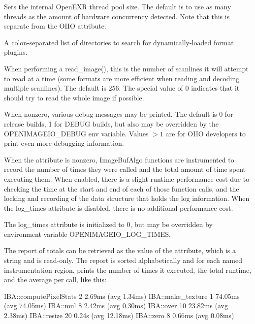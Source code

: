 \vspace{10pt}
Sets the internal OpenEXR thread pool size. The default is to use as many
threads as the amount of hardware concurrency detected.
Note that this is separate from the OIIO
 attribute.
\apiend

\vspace{10pt}
A colon-separated list of directories to search for 
dynamically-loaded format plugins.
\apiend

\vspace{10pt}
When performing a {\cf read_image()}, this is the number of scanlines it
will attempt to read at a time (some formats are more efficient when reading
and decoding multiple scanlines).  The default is 256.  The special value
of 0 indicates that it should try to read the whole image if possible.
\apiend

\vspace{10pt}
When nonzero, various debug messages may be printed. The default is 0 for
release builds, 1 for {\cf DEBUG} builds, but also may be overridden by the
{\cf OPENIMAGEIO\_DEBUG} env variable. Values $> 1$ are for OIIO developers
to print even more debugging information.
\apiend

\vspace{10pt}
 

When the  attribute is nonzero, {\cf ImageBufAlgo} functions
are instrumented to record the number of times they were called and the
total amount of time spent executing them. When enabled, there is a slight
runtime performance cost due to checking the time at the start and end of
each of those function calls, and the locking and recording of the data
structure that holds the log information. When the {\cf log_times} attribute
is disabled, there is no additional performance cost.

The {\cf log_times} attribute is initialized to 0, but may be overridden by
environment variable {\cf OPENIMAGEIO_LOG_TIMES}.

The report of totals can be retrieved as the value of the
 attribute, which is a string and is read-only. The
report is sorted alphabetically and for each named instrumentation region,
prints the number of times it executed, the total runtime, and the average
per call, like this:
\begin{code}
    IBA::computePixelStats        2   2.69ms  (avg   1.34ms)
    IBA::make_texture             1  74.05ms  (avg  74.05ms)
    IBA::mul                      8   2.42ms  (avg   0.30ms)
    IBA::over                    10  23.82ms  (avg   2.38ms)
    IBA::resize                  20   0.24s   (avg  12.18ms)
    IBA::zero                     8   0.66ms  (avg   0.08ms)
\end{code}

